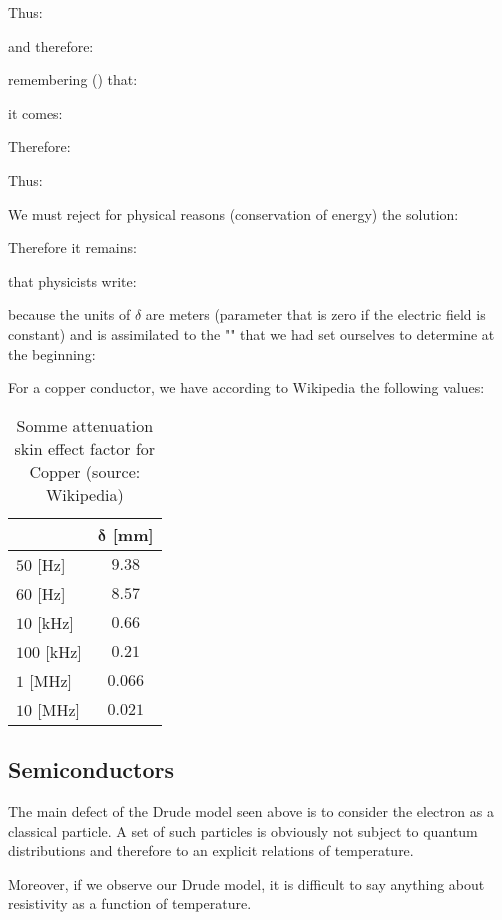 	Thus:
	
	and therefore:
	
	remembering () that:
	
	it comes:
	
	Therefore:
	
	Thus:
	
	We must reject for physical reasons (conservation of energy) the solution:
	
	Therefore it remains:
	
	that physicists write:
	
	because the units of $\delta$ are meters (parameter that is zero if the electric field is constant) and is assimilated to the "" that we had set ourselves to determine at the beginning:
	
	For a copper conductor, we have according to Wikipedia the following values:
	\begin{table}[H]
		\centering
		\begin{tabular}{|l|c|}
		\hline
		\rowcolor[HTML]{9B9B9B} 
		\multicolumn{1}{|c|}{\cellcolor[HTML]{9B9B9B}\textbf{Frequency}} & \textbf{$\pmb{\delta}$ [mm]} \\ \hline
		$50$ [Hz] & $9.38$ \\ \hline
		$60$ [Hz] & $8.57$ \\ \hline
		$10$ [kHz] & $0.66$ \\ \hline
		$100$ [kHz] & $0.21$ \\ \hline
		$1$ [MHz] & $0.066$ \\ \hline
		$10$ [MHz] & $0.021$ \\ \hline
		\end{tabular}
		\caption[Some attenuation skin effect factor for Copper]{Somme attenuation skin effect factor for Copper (source: Wikipedia)}
	\end{table}

	\pagebreak
	\subsection{Semiconductors}\label{semiconductors}
	The main defect of the Drude model seen above is to consider the electron as a classical particle. A set of such particles is obviously not subject to quantum distributions and therefore to an explicit relations of temperature.

	Moreover, if we observe our Drude model, it is difficult to say anything about resistivity as a function of temperature.

